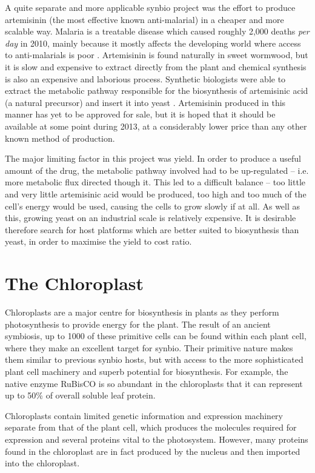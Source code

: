 A quite separate and more applicable synbio project was the effort to produce 
artemisinin (the most effective known anti-malarial) in a cheaper and more 
scalable way.
Malaria is a treatable disease which caused roughly 2,000 deaths 
\emph{per day} in 2010, mainly because it mostly affects the developing world 
where access to anti-malarials is poor \citep{malaria}.
Artemisinin is found naturally in sweet wormwood, but it is slow and expensive
to extract directly from the plant and chemical synthesis is also an expensive
and laborious process.
Synthetic biologists were able to extract the metabolic pathway responsible for
the biosynthesis of artemisinic acid (a natural precursor) and insert it into 
yeast \citep{yeast}.
Artemisinin produced in this manner has yet to be approved for sale, but it is
hoped that it should be available at some point during 2013, at a considerably
lower price than any other known method of production.

The major limiting factor in this project was yield.
In order to produce a useful amount of the drug, the metabolic pathway 
involved had to be up-regulated -- i.e. more metabolic flux directed though it.
This led to a difficult balance -- too little and very little
artemisinic acid would be produced, too high and too much of the cell's
energy would be used, causing the cells to grow slowly if at all.
As well as this, growing yeast on an industrial scale is relatively expensive.
It is desirable therefore search for host platforms which are better suited to
biosynthesis than yeast, in order to maximise the yield to cost ratio.

\section{The Chloroplast}
\label{sec:intro_chloroplast}

Chloroplasts are a major centre for biosynthesis in plants as they perform
photosynthesis to provide energy for the plant.
The result of an ancient symbiosis, up to 1000 of these primitive cells can be 
found within each plant cell, where they make an excellent target for synbio.
Their primitive nature makes them similar to previous synbio hosts, 
but with access to the more sophisticated plant cell machinery and 
superb potential for biosynthesis.
For example, the native enzyme RuBisCO is so abundant in the chloroplasts that 
it can represent up to 50\% of overall soluble leaf protein.

Chloroplasts contain limited genetic information and expression machinery 
separate from that of the plant cell, which produces the molecules required 
for expression and several proteins vital to the photosystem.
However, many proteins found in the chloroplast are in fact produced by the
nucleus and then imported into the chloroplast.

